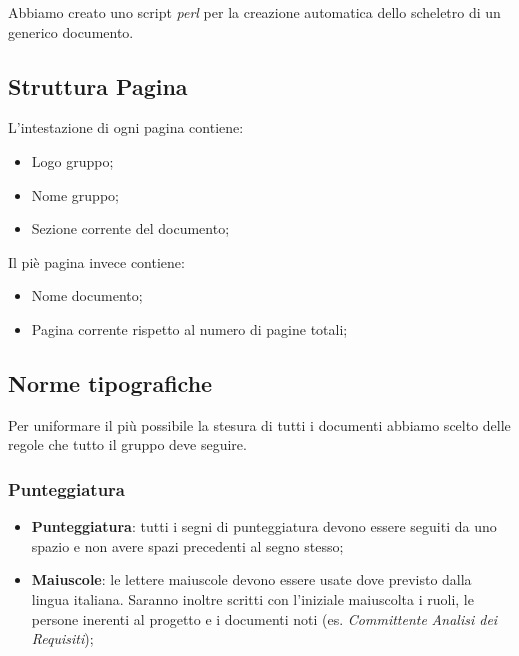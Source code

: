 \documentclass{scalatekids-article}
\begin{document}
Abbiamo creato uno script \textit{perl} per la creazione automatica dello scheletro di un generico documento.

\subsection{Struttura Pagina}
L'intestazione di ogni pagina contiene:
\begin{itemize}
\item Logo gruppo;
\item Nome gruppo;
\item Sezione corrente del documento;
\end{itemize}
Il piè pagina invece contiene:
\begin{itemize}
\item Nome documento;
\item Pagina corrente rispetto al numero di pagine totali;
\end{itemize}

\subsection{Norme tipografiche}
Per uniformare il più possibile la stesura di tutti i documenti abbiamo scelto delle regole che tutto il gruppo deve seguire.

\subsubsection{Punteggiatura}
\begin{itemize}
\item \textbf{Punteggiatura}: tutti i segni di punteggiatura devono essere seguiti da uno spazio e non avere spazi precedenti al segno stesso;
\item \textbf{Maiuscole}: le lettere maiuscole devono essere usate dove previsto dalla lingua italiana.
  Saranno inoltre scritti con l'iniziale maiuscolta i ruoli, le persone inerenti al progetto e i documenti noti (es. \textit{Committente} \textit{Analisi dei Requisiti});
\end{itemize}
\end{document}
